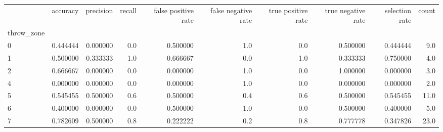 \begin{tabular}{lrrrrrrrrr}
\toprule
{} &  accuracy &  precision &  recall &  false positive rate &  false negative rate &  true positive rate &  true negative rate &  selection rate &  count \\
throw\_zone &           &            &         &                      &                      &                     &                     &                 &        \\
\midrule
0          &  0.444444 &   0.000000 &     0.0 &             0.500000 &                  1.0 &                 0.0 &            0.500000 &        0.444444 &    9.0 \\
1          &  0.500000 &   0.333333 &     1.0 &             0.666667 &                  0.0 &                 1.0 &            0.333333 &        0.750000 &    4.0 \\
2          &  0.666667 &   0.000000 &     0.0 &             0.000000 &                  1.0 &                 0.0 &            1.000000 &        0.000000 &    3.0 \\
4          &  0.000000 &   0.000000 &     0.0 &             0.000000 &                  1.0 &                 0.0 &            0.000000 &        0.000000 &    2.0 \\
5          &  0.545455 &   0.500000 &     0.6 &             0.500000 &                  0.4 &                 0.6 &            0.500000 &        0.545455 &   11.0 \\
6          &  0.400000 &   0.000000 &     0.0 &             0.500000 &                  1.0 &                 0.0 &            0.500000 &        0.400000 &    5.0 \\
7          &  0.782609 &   0.500000 &     0.8 &             0.222222 &                  0.2 &                 0.8 &            0.777778 &        0.347826 &   23.0 \\
\bottomrule
\end{tabular}
